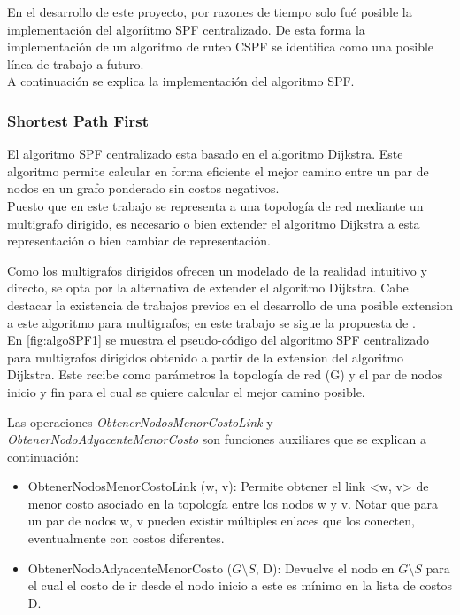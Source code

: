 En el desarrollo de este proyecto, por razones de tiempo solo fu\'e posible la implementaci\'on del algor\'iitmo SPF centralizado. De esta forma la implementaci\'on de un algoritmo de ruteo CSPF se identifica como una posible l\'inea de trabajo a futuro.\\

A continuaci\'on se explica la implementaci\'on del algoritmo SPF. 

\subsubsection{Shortest Path First}
El algoritmo SPF centralizado esta basado en el algoritmo Dijkstra. Este algoritmo permite calcular en forma eficiente el mejor camino entre un par de nodos en un grafo ponderado sin costos negativos.\\

Puesto que en este trabajo se representa a una topolog\'ia de red mediante un multigrafo dirigido, es necesario o bien extender el algoritmo Dijkstra a esta representaci\'on o bien cambiar de representaci\'on. 

Como los multigrafos dirigidos ofrecen un modelado de la realidad intuitivo y directo, se opta por la alternativa de extender el algoritmo Dijkstra. Cabe destacar la existencia de trabajos previos en el desarrollo de una posible extension a este algoritmo para multigrafos; en este trabajo se sigue la propuesta de \cite{biswas2013generalization}.\\


En \ref{fig:algoSPF1} se muestra el pseudo-c\'odigo del algoritmo SPF centralizado para multigrafos dirigidos obtenido a partir de la extension del algoritmo Dijkstra. Este recibe como par\'ametros la topolog\'ia de red (G) y el par de nodos inicio y fin para el cual se quiere calcular el mejor camino posible. 

Las operaciones \textit{ObtenerNodosMenorCostoLink} y \textit{ObtenerNodoAdyacenteMenorCosto} son funciones auxiliares que se explican a continuación:

\begin{itemize}
\item ObtenerNodosMenorCostoLink (w, v): Permite obtener el link <w, v> de menor costo asociado en la topolog\'ia entre los nodos w y v. Notar que para un par de nodos w, v pueden existir m\'ultiples enlaces que los conecten, eventualmente con costos diferentes. 

\item ObtenerNodoAdyacenteMenorCosto ($G\setminus S$, D): Devuelve el nodo en $G\setminus S$ para el cual el costo de ir desde el nodo inicio a este es m\'inimo en la lista de costos D.
\end{itemize}

